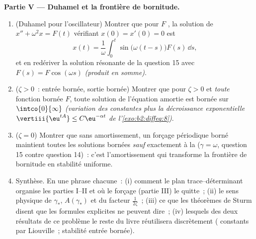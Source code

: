\begin{problem}
\medskip
\noindent\textbf{Partie V --- Duhamel et la frontière de
bornitude.}
\begin{enumerate}[resume]
  \item (Duhamel pour l'oscillateur) Montrer que pour $F$
        , la solution de $x'' + \omega^2x =
        F(t)$ vérifiant $x(0) = x'(0) = 0$ est
        \[
        x(t) = \frac1\omega\int_0^t\sin\bigl(\omega(t -
        s)\bigr)F(s)\,\dd s ,
        \]
        et en redériver la solution résonante de la question 15
        avec $F(s) = F\cos(\omega s)$
        \emph{(produit en somme)}.
  \item ($\zeta > 0$~: entrée bornée, sortie bornée) Montrer
        que pour $\zeta > 0$ et \emph{toute} fonction 
        bornée $F$, toute solution de l'équation amortie est
        bornée sur $\intco{0}{\infty}$ \emph{(variation des
        constantes plus la décroissance exponentielle
        $\vertiii{\eu^{tA}} \leq C\eu^{-\alpha t}$ de
        l'\cref{exo:b2:diffeq:8})}.
  \item ($\zeta = 0$) Montrer que sans amortissement, un forçage
        périodique borné maintient toutes les solutions bornées
        \emph{sauf} exactement à la  ($\gamma =
        \omega$, question 15 contre question 14)~: c'est
        l'amortissement qui transforme la frontière de bornitude
        en stabilité uniforme.
  \item Synthèse. En une phrase chacune~: (i) comment le
        plan trace--déterminant organise les parties I--II et
        où le forçage (partie III) le quitte~; (ii) le
        sens physique de $\gamma_*$, $A(\gamma_*)$ et
        du facteur $\frac1{2\zeta}$~; (iii) ce que les
        théorèmes de Sturm disent que les formules explicites ne
        peuvent dire~; (iv) lesquels des deux résultats de ce
        problème le reste du livre réutilisera discrètement
        ( constants par Liouville~; stabilité entrée
        bornée).
\end{enumerate}
\end{problem}
